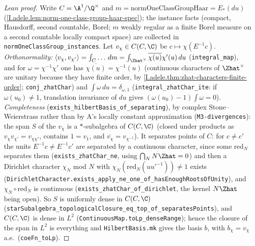 \begin{proof}[Lean proof]
Write $C=\A^1/\Q^\times$ and $m=\mathrm{normOneClassGroupHaar}=E_*(du)$ (\cref{I.adele.lem:norm-one-class-group-haar-spec}); the instance facts (compact, Hausdorff, second countable, Borel; $m$ weakly regular as a finite Borel measure on a second countable locally compact space) are collected in \texttt{normOneClassGroup\_instances}. Let $v_\chi\in C(C,\C)$ be $c\mapsto\chi(E^{-1}c)$. \emph{Orthonormality:} $\langle v_\chi,v_{\chi'}\rangle=\int_C\ldots\,dm=\int_{\Zhat^\times}\overline{\chi(u)}\chi'(u)\,du$ (\texttt{integral\_map}), and for $\omega=\chi^{-1}\chi'$ one has $\overline{\chi(u)}=\chi^{-1}(u)$ (continuous characters of $\Zhat^\times$ are unitary because they have finite order, by \cref{I.adele.thm:zhat-characters-finite-order}; \texttt{conj\_zhatChar}) and $\int\omega\,du=\delta_{\omega,1}$ (\texttt{integral\_zhatChar\_ite}: if $\omega(u_0)\ne1$, translation invariance of $du$ gives $(\omega(u_0)-1)\int\omega=0$). \emph{Completeness} (\texttt{exists\_hilbertBasis\_of\_separating}), by complex Stone--Weierstrass rather than by A's locally constant approximation (\texttt{M3-divergences}): the span $S$ of the $v_\chi$ is a $*$-subalgebra of $C(C,\C)$ (closed under products as $v_\chi v_{\chi'}=v_{\chi\chi'}$, contains $1=v_1$, and $\overline{v_\chi}=v_{\chi^{-1}}$). It separates points of $C$: for $c\ne c'$ the units $E^{-1}c\ne E^{-1}c'$ are separated by a continuous character, since some $\mathrm{red}_N$ separates them (\texttt{exists\_zhatChar\_ne}, using $\bigcap_N N\Zhat=0$) and then a Dirichlet character $\chi_N$ mod $N$ with $\chi_N(\mathrm{red}_N(uu'^{-1}))\ne1$ exists (\texttt{DirichletCharacter.exists\_apply\_ne\_one\_of\_hasEnoughRootsOfUnity}), and $\chi_N\circ\mathrm{red}_N$ is continuous (\texttt{exists\_zhatChar\_of\_dirichlet}, the kernel $N\Zhat$ being open). So $S$ is uniformly dense in $C(C,\C)$ (\texttt{starSubalgebra\_topologicalClosure\_eq\_top\_of\_separatesPoints}), and $C(C,\C)$ is dense in $L^2$ (\texttt{ContinuousMap.toLp\_denseRange}); hence the closure of the span in $L^2$ is everything and \texttt{HilbertBasis.mk} gives the basis $b$, with $b_\chi=v_\chi$ a.e.\ (\texttt{coeFn\_toLp}).
\end{proof}

